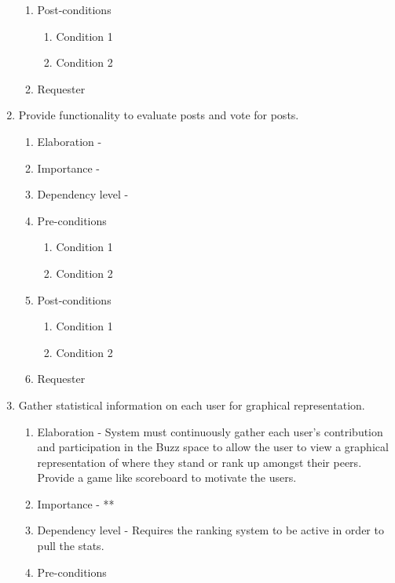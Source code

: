 \documentclass[12pt]{article}
\begin{document}
\begin{enumerate}
\begin{enumerate}
        \item Post-conditions
    \begin{enumerate}
    	\item Condition 1
    	\item Condition 2
    \end{enumerate}
    \item Requester
  \end{enumerate}
\newpage %
   \item  Provide functionality to evaluate posts and vote for posts. %
  \begin{enumerate}
    \item Elaboration - 
    \item Importance - 
    \item Dependency level - 
    \item Pre-conditions
    \begin{enumerate}
    	\item Condition 1
    	\item Condition 2
    \end{enumerate}
        \item Post-conditions
    \begin{enumerate}
    	\item Condition 1
    	\item Condition 2
    \end{enumerate}
    \item Requester
  \end{enumerate}
\newpage %
   \item Gather statistical information on each user for graphical representation. %
  \begin{enumerate}
    \item Elaboration - System must continuously gather each user’s contribution and participation in the Buzz space to allow the user to view a graphical representation of where they stand or rank up amongst their peers. Provide a game like scoreboard to motivate the users.
    \item Importance - **
    \item Dependency level - Requires the ranking system to be active in order to pull the stats. 
    \item Pre-conditions
    \begin{enumerate}

\end{enumerate}
\end{enumerate}
\end{enumerate}
\end{document}
